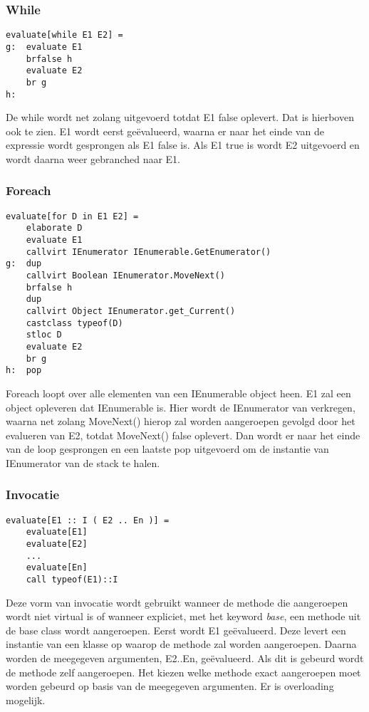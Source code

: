 \subsubsection{While}
\begin{lstlisting}
evaluate[while E1 E2] =
g:	evaluate E1
	brfalse h
	evaluate E2
	br g
h:
\end{lstlisting}
De while wordt net zolang uitgevoerd totdat E1 false oplevert. Dat is hierboven ook te zien. E1 wordt eerst ge\"evalueerd, waarna er naar het einde van de expressie wordt gesprongen als E1 false is. Als E1 true is wordt E2 uitgevoerd en wordt daarna weer gebranched naar E1.

\subsubsection{Foreach}
\begin{lstlisting}
evaluate[for D in E1 E2] =
	elaborate D
	evaluate E1
	callvirt IEnumerator IEnumerable.GetEnumerator()
g:	dup
	callvirt Boolean IEnumerator.MoveNext()
	brfalse h
	dup
	callvirt Object IEnumerator.get_Current()
	castclass typeof(D)
	stloc D
	evaluate E2
	br g
h:	pop
\end{lstlisting}
Foreach loopt over alle elementen van een IEnumerable object heen. E1 zal een object opleveren dat IEnumerable is. Hier wordt de IEnumerator van verkregen, waarna net zolang MoveNext() hierop zal worden aangeroepen gevolgd door het evalueren van E2, totdat MoveNext() false oplevert. Dan wordt er naar het einde van de loop gesprongen en een laatste pop uitgevoerd om de instantie van IEnumerator van de stack te halen.

\subsubsection{Invocatie}
\begin{lstlisting}
evaluate[E1 :: I ( E2 .. En )] =
	evaluate[E1]
	evaluate[E2]
	...
	evaluate[En]
	call typeof(E1)::I
\end{lstlisting}
Deze vorm van invocatie wordt gebruikt wanneer de methode die aangeroepen wordt niet virtual is of wanneer expliciet, met het keyword \textit{base}, een methode uit de base class wordt aangeroepen. Eerst wordt E1 ge\"evalueerd. Deze levert een instantie van een klasse op waarop de methode zal worden aangeroepen. Daarna worden de meegegeven argumenten, E2..En, ge\"evalueerd. Als dit is gebeurd wordt de methode zelf aangeroepen. Het kiezen welke methode exact aangeroepen moet worden gebeurd op basis van de meegegeven argumenten. Er is overloading mogelijk.

